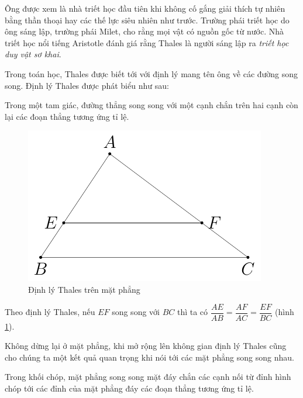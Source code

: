 Ông được xem là nhà triết học đầu tiên khi không cố gắng giải thích tự nhiên bằng thần thoại hay các thế lực siêu nhiên như trước. Trường phái triết học do ông sáng lập, trường phái Milet, cho rằng mọi vật có nguồn gốc từ nước. Nhà triết học nổi tiếng Aristotle đánh giá rằng Thales là người sáng lập ra \textit{triết học duy vật sơ khai}.

Trong toán học, Thales được biết tới với định lý mang tên ông về các đường song song. Định lý Thales được phát biểu như sau:

\begin{theorem}
    Trong một tam giác, đường thẳng song song với một cạnh chắn trên hai cạnh còn lại các đoạn thẳng tương ứng tỉ lệ.
\end{theorem}

\begin{figure}[ht]
	\centering
	\includegraphics[page=1]{analytic_geometry/thales_theorem.pdf}
	\caption{Định lý Thales trên mặt phẳng}
	\label{thales1}
\end{figure}

Theo định lý Thales, nếu $EF$ song song với $BC$ thì ta có $\dfrac{AE}{AB} = \dfrac{AF}{AC} = \dfrac{EF}{BC}$ (hình \ref{thales1}).

Không dừng lại ở mặt phẳng, khi mở rộng lên không gian định lý Thales cũng cho chúng ta một kết quả quan trọng khi nói tới các mặt phẳng song song nhau.

\begin{theorem}
    Trong khối chóp, mặt phẳng song song mặt đáy chắn các cạnh nối từ đỉnh hình chóp tới các đỉnh của mặt phẳng đáy các đoạn thẳng tương ứng tỉ lệ.
\end{theorem}

